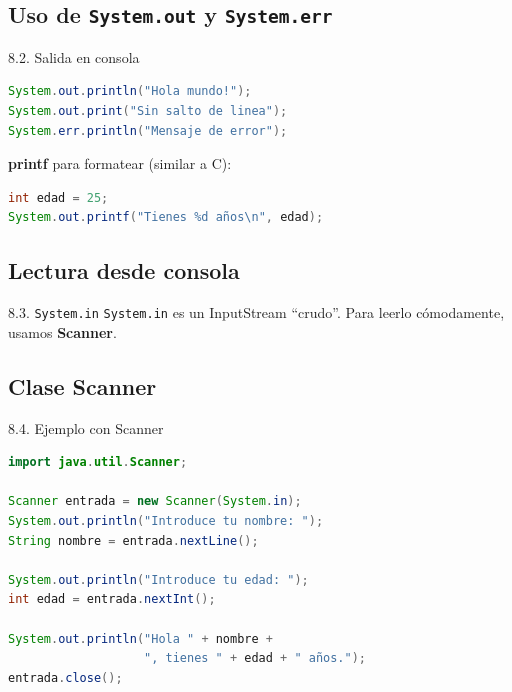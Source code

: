\documentclass{beamer}
\begin{document}
\subsection{Uso de \texttt{System.out} y \texttt{System.err}}

\begin{frame}[fragile]{8.2. Salida en consola}
\begin{lstlisting}[language=Java]
System.out.println("Hola mundo!");
System.out.print("Sin salto de linea");
System.err.println("Mensaje de error");
\end{lstlisting}

\textbf{printf} para formatear (similar a C):
\begin{lstlisting}[language=Java]
int edad = 25;
System.out.printf("Tienes %d años\n", edad);
\end{lstlisting}
\end{frame}

\subsection{Lectura desde consola}

\begin{frame}{8.3. \texttt{System.in}}
\texttt{System.in} es un InputStream “crudo”. Para leerlo cómodamente, usamos \textbf{Scanner}.
\end{frame}

\subsection{Clase Scanner}

\begin{frame}[fragile]{8.4. Ejemplo con Scanner}
\begin{lstlisting}[language=Java]
import java.util.Scanner;

Scanner entrada = new Scanner(System.in);
System.out.println("Introduce tu nombre: ");
String nombre = entrada.nextLine();

System.out.println("Introduce tu edad: ");
int edad = entrada.nextInt();

System.out.println("Hola " + nombre + 
                   ", tienes " + edad + " años.");
entrada.close();
\end{lstlisting}
\end{frame}

\end{document}
